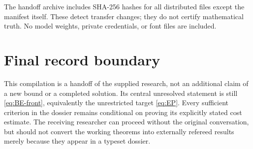 The handoff archive includes SHA-256 hashes for all distributed files except the
manifest itself. These detect transfer changes; they do not certify mathematical
truth. No model weights, private credentials, or font files are included.

\section{Final record boundary}
This compilation is a handoff of the supplied research, not an additional claim
of a new bound or a completed solution. Its central unresolved statement is still
\eqref{eq:BE-front}, equivalently the unrestricted target \eqref{eq:EP}. Every
sufficient criterion in the dossier remains conditional on proving its explicitly
stated cost estimate. The receiving researcher can proceed without the original
conversation, but should not convert the working theorems into externally
refereed results merely because they appear in a typeset dossier.
